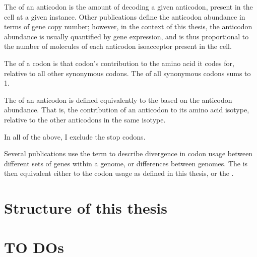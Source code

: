 The  of an anticodon is the amount of \trna
decoding a given anticodon, present in the cell at a given instance. Other
publications define the anticodon abundance in terms of \trna gene copy number;
however, in the context of this thesis, the anticodon abundance is usually
quantified by \trna gene expression, and is thus proportional to the number of
\trna molecules of each anticodon isoacceptor present in the cell.

The  of a codon is that codon’s contribution to the amino acid it
codes for, relative to all other synonymous codons. The \rcu of all synonymous
codons sums to \num{1}.

The  of an anticodon is defined equivalently to the \rcu based on
the anticodon abundance. That is, the contribution of an anticodon to its amino
acid isotype, relative to the other anticodons in the same isotype.

In all of the above, I exclude the stop codons.

Several publications use the term \cub to describe divergence in codon usage
between different sets of genes within a genome, or differences between genomes.
The \cub is then equivalent either to the codon usage as defined in this thesis,
or the \rcu.

\section{Structure of this thesis}


\section{TO DOs}


